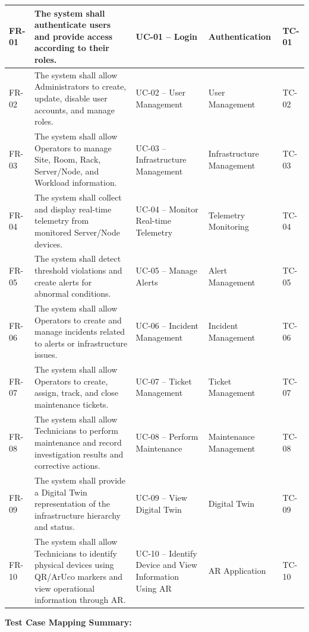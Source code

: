 \begin{xltabular}{\textwidth}{|>{\centering\arraybackslash}p{1.8cm}|>{\raggedright\arraybackslash}X|>{\raggedright\arraybackslash}p{2.8cm}|>{\raggedright\arraybackslash}p{2.2cm}|>{\centering\arraybackslash}p{1.5cm}|}
FR-01 & The system shall authenticate users and provide access according to their roles. & UC-01 – Login & Authentication & TC-01 \\ \hline
FR-02 & The system shall allow Administrators to create, update, disable user accounts, and manage roles. & UC-02 – User Management & User Management & TC-02 \\ \hline
FR-03 & The system shall allow Operators to manage Site, Room, Rack, Server/Node, and Workload information. & UC-03 – Infrastructure Management & Infrastructure Management & TC-03 \\ \hline
FR-04 & The system shall collect and display real-time telemetry from monitored Server/Node devices. & UC-04 – Monitor Real-time Telemetry & Telemetry Monitoring & TC-04 \\ \hline
FR-05 & The system shall detect threshold violations and create alerts for abnormal conditions. & UC-05 – Manage Alerts & Alert Management & TC-05 \\ \hline
FR-06 & The system shall allow Operators to create and manage incidents related to alerts or infrastructure issues. & UC-06 – Incident Management & Incident Management & TC-06 \\ \hline
FR-07 & The system shall allow Operators to create, assign, track, and close maintenance tickets. & UC-07 – Ticket Management & Ticket Management & TC-07 \\ \hline
FR-08 & The system shall allow Technicians to perform maintenance and record investigation results and corrective actions. & UC-08 – Perform Maintenance & Maintenance Management & TC-08 \\ \hline
FR-09 & The system shall provide a Digital Twin representation of the infrastructure hierarchy and status. & UC-09 – View Digital Twin & Digital Twin & TC-09 \\ \hline
FR-10 & The system shall allow Technicians to identify physical devices using QR/ArUco markers and view operational information through AR. & UC-10 – Identify Device and View Information Using AR & AR Application & TC-10 \\ \hline
\end{xltabular}
\endgroup

\vspace{1.5em}

\noindent\textbf{Test Case Mapping Summary:}

\vspace{0.5em}

\begingroup
\small
\setlength{\tabcolsep}{6pt}
\renewcommand{\arraystretch}{1.2}

